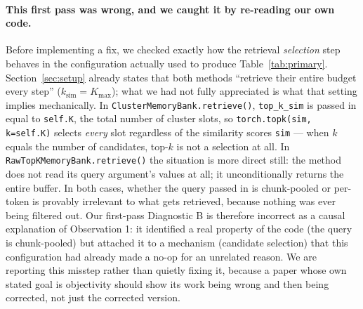 \documentclass[11pt]{article}
\begin{document}
\paragraph{This first pass was wrong, and we caught it by re-reading our own code.} Before
implementing a fix, we checked exactly how the retrieval \emph{selection} step behaves in the
configuration actually used to produce Table~\ref{tab:primary}. Section~\ref{sec:setup}
already states that both methods ``retrieve their entire budget every step''
($k_{\text{sim}} = K_{\max}$); what we had not fully appreciated is what that setting implies
mechanically. In \texttt{ClusterMemoryBank.retrieve()}, \texttt{top\_k\_sim} is passed in equal to
\texttt{self.K}, the total number of cluster slots, so \texttt{torch.topk(sim, k=self.K)} selects
\emph{every} slot regardless of the similarity scores \texttt{sim} --- when $k$ equals the number
of candidates, top-$k$ is not a selection at all. In \texttt{RawTopKMemoryBank.retrieve()} the
situation is more direct still: the method does not read its query argument's values at all; it
unconditionally returns the entire buffer. In both cases, whether the query passed in is
chunk-pooled or per-token is provably irrelevant to what gets retrieved, because nothing was ever
being filtered out. Our first-pass Diagnostic B is therefore incorrect as a causal explanation of
Observation 1: it identified a real property of the code (the query is chunk-pooled) but attached
it to a mechanism (candidate selection) that this configuration had already made a no-op for an
unrelated reason. We are reporting this misstep rather than quietly fixing it, because a paper
whose own stated goal is objectivity should show its work being wrong and then being corrected, not
just the corrected version.
\end{document}
